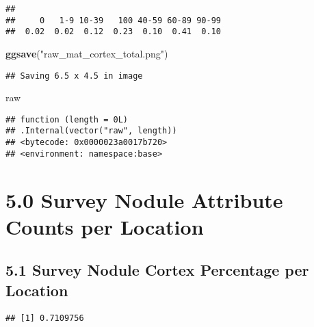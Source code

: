 \documentclass[
]{article}
\newenvironment{Shaded}{\begin{snugshade}}{\end{snugshade}}
\newcommand{\FunctionTok}[1]{\textcolor[rgb]{0.13,0.29,0.53}{\textbf{#1}}}
\newcommand{\NormalTok}[1]{#1}
\newcommand{\SpecialCharTok}[1]{\textcolor[rgb]{0.81,0.36,0.00}{\textbf{#1}}}
\newcommand{\StringTok}[1]{\textcolor[rgb]{0.31,0.60,0.02}{#1}}
\begin{document}
\begin{verbatim}
## 
##     0   1-9 10-39   100 40-59 60-89 90-99 
##  0.02  0.02  0.12  0.23  0.10  0.41  0.10
\end{verbatim}

\begin{Shaded}
\begin{Highlighting}[]
\FunctionTok{ggsave}\NormalTok{(}\StringTok{"raw\_mat\_cortex\_total.png"}\NormalTok{)}
\end{Highlighting}
\end{Shaded}

\begin{verbatim}
## Saving 6.5 x 4.5 in image
\end{verbatim}

\begin{Shaded}
\begin{Highlighting}[]
\NormalTok{raw}
\end{Highlighting}
\end{Shaded}

\begin{verbatim}
## function (length = 0L) 
## .Internal(vector("raw", length))
## <bytecode: 0x0000023a0017b720>
## <environment: namespace:base>
\end{verbatim}

\hypertarget{survey-nodule-attribute-counts-per-location}{%
\section{5.0 Survey Nodule Attribute Counts per
Location}\label{survey-nodule-attribute-counts-per-location}}

\hypertarget{survey-nodule-cortex-percentage-per-location}{%
\subsection{5.1 Survey Nodule Cortex Percentage per
Location}\label{survey-nodule-cortex-percentage-per-location}}

\begin{Shaded}
\end{Shaded}

\begin{verbatim}
## [1] 0.7109756
\end{verbatim}
\end{document}
